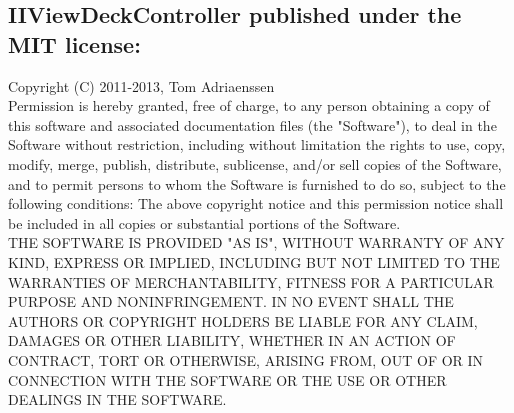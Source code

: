 \documentclass[a4wide, 10pt]{article}
\begin{document}
\subsection{IIViewDeckController published under the MIT license:}

Copyright (C) 2011-2013, Tom Adriaenssen\\
Permission is hereby granted, free of charge, to any person obtaining a copy of this software and associated documentation files (the "Software"), to deal in the Software without restriction, including without limitation the rights to use, copy, modify, merge, publish, distribute, sublicense, and/or sell copies of the Software, and to permit persons to whom the Software is furnished to do so, subject to the following conditions:
The above copyright notice and this permission notice shall be included in all copies or substantial portions of the Software.\\
THE SOFTWARE IS PROVIDED "AS IS", WITHOUT WARRANTY OF ANY KIND, EXPRESS OR IMPLIED, INCLUDING BUT NOT LIMITED TO THE WARRANTIES OF MERCHANTABILITY, FITNESS FOR A PARTICULAR PURPOSE AND NONINFRINGEMENT. IN NO EVENT SHALL THE AUTHORS OR COPYRIGHT HOLDERS BE LIABLE FOR ANY CLAIM, DAMAGES OR OTHER LIABILITY, WHETHER IN AN ACTION OF CONTRACT, TORT OR OTHERWISE, ARISING FROM, OUT OF OR IN CONNECTION WITH THE SOFTWARE OR THE USE OR OTHER DEALINGS IN THE SOFTWARE.
\end{document}
